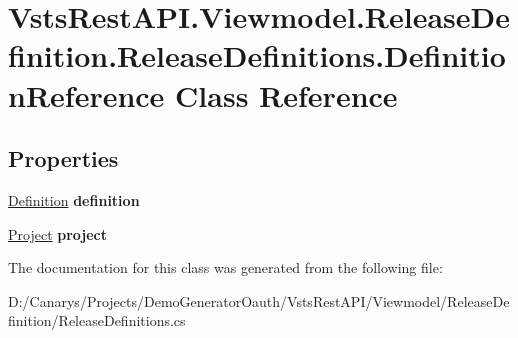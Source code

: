 \hypertarget{class_vsts_rest_a_p_i_1_1_viewmodel_1_1_release_definition_1_1_release_definitions_1_1_definition_reference}{}\section{Vsts\+Rest\+A\+P\+I.\+Viewmodel.\+Release\+Definition.\+Release\+Definitions.\+Definition\+Reference Class Reference}
\label{class_vsts_rest_a_p_i_1_1_viewmodel_1_1_release_definition_1_1_release_definitions_1_1_definition_reference}
\subsection*{Properties}
\begin{DoxyCompactItemize}
\item 
\mbox{\label{class_vsts_rest_a_p_i_1_1_viewmodel_1_1_release_definition_1_1_release_definitions_1_1_definition_reference_a645d9321e9c5957ebdd68dc1fe9c330d}} 
\mbox{\hyperlink{class_vsts_rest_a_p_i_1_1_viewmodel_1_1_release_definition_1_1_release_definitions_1_1_definition}{Definition}} {\bfseries definition}
\item 
\mbox{\label{class_vsts_rest_a_p_i_1_1_viewmodel_1_1_release_definition_1_1_release_definitions_1_1_definition_reference_a64759e5bfa519f6b2acde2f620d4c88f}} 
\mbox{\hyperlink{class_vsts_rest_a_p_i_1_1_viewmodel_1_1_release_definition_1_1_release_definitions_1_1_project}{Project}} {\bfseries project}
\end{DoxyCompactItemize}


The documentation for this class was generated from the following file\+:\begin{DoxyCompactItemize}
\item 
D\+:/\+Canarys/\+Projects/\+Demo\+Generator\+Oauth/\+Vsts\+Rest\+A\+P\+I/\+Viewmodel/\+Release\+Definition/Release\+Definitions.\+cs\end{DoxyCompactItemize}
